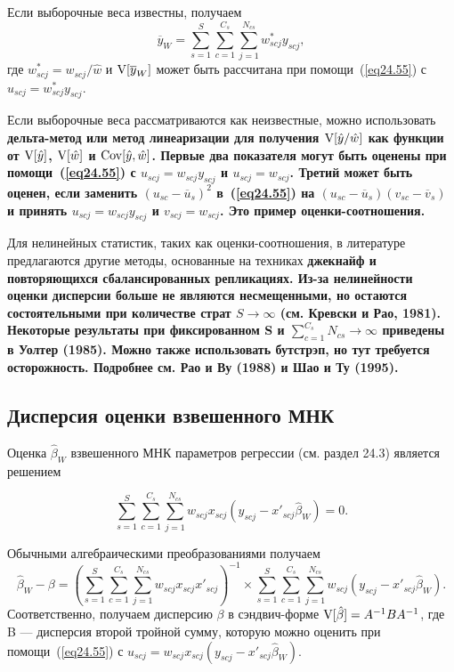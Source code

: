 Если выборочные веса известны, получаем
$$
\overline{y}_W = \sum_{s=1}^S \sum_{c=1}^{C_s} \sum_{j=1}^{N_{cs}} w^*_{scj} y_{scj},
$$
где $w^*_{scj} =w_{scj} / \hat w$ и $\mathrm{V}[\overline{y}_W]$ может быть рассчитана при помощи~(\ref{eq24.55}) с $u_{scj} = w^*_{scj} y_{scj}$. 

Если выборочные веса рассматриваются как неизвестные, можно использовать \bfseries дельта-метод \mdseries или \bfseries  метод линеаризации \mdseries для получения $\mathrm{V}[\hat y / \hat w]$ как функции от $\mathrm{V}[\hat y]$, $\mathrm{V}[\hat w]$ и $\mathrm{Cov}[\hat y, \hat w]$. Первые два показателя могут быть оценены при помощи~(\ref{eq24.55}) с $u_{scj} = w_{scj} y_{scj}$ и $u_{scj} = w_{scj}$. Третий может быть оценен, если заменить $(u_{sc} - \overline{u}_s)^2$ в~(\ref{eq24.55}) на $(u_{sc} - \overline{u}_s) (v_{sc} - \overline{v}_s)$ и принять $u_{scj} = w_{scj} y_{scj}$ и $v_{scj} = w_{scj}$. Это пример оценки-соотношения. 

Для нелинейных статистик, таких как оценки-соотношения, в литературе предлагаются другие методы, основанные на техниках \bfseries джекнайф \mdseries и \bfseries повторяющихся сбалансированных репликациях. \mdseries Из-за нелинейности оценки дисперсии больше не являются несмещенными, но остаются состоятельными при количестве страт $S \to \infty$ (см. Кревски и Рао, 1981). Некоторые результаты при фиксированном S и $\sum_{c=1}^{C_s} N_{cs} \to \infty$ приведены в Уолтер (1985). Можно также использовать \bfseries бутстрэп\mdseries, но тут требуется осторожность. Подробнее см. Рао и Ву (1988) и Шао и Ту (1995). 


\subsection*{Дисперсия оценки взвешенного МНК}

Оценка $\hat \beta_W$ взвешенного МНК параметров регрессии (см. раздел 24.3) является решением

$$
\sum_{s=1}^S \sum_{c=1}^{C_s} \sum_{j=1}^{N_{cs}} w_{scj} x_{scj} (y_{scj} - x'_{scj} \hat \beta_W) = 0.
$$

Обычными алгебраическими преобразованиями получаем
$$
\hat \beta_W - \beta = \left( \sum_{s=1}^S \sum_{c=1}^{C_s} \sum_{j=1}^{N_{cs}} w_{scj} x_{scj} x'_{scj} \right)^{-1} \times \sum_{s=1}^S \sum_{c=1}^{C_s} \sum_{j=1}^{N_{cs}} w_{scj} (y_{scj} - x'_{scj} \hat \beta_W).
$$
Соответственно, получаем дисперсию $\beta$ в сэндвич-форме $\mathrm{V}[\hat \beta] = A^{-1} B A^{-1}$, где B --- дисперсия второй тройной сумму, которую можно оценить при помощи~(\ref{eq24.55}) с $u_{scj} = w_{scj} x_{scj} (y_{scj} - x'_{scj} \hat \beta_W)$. 

